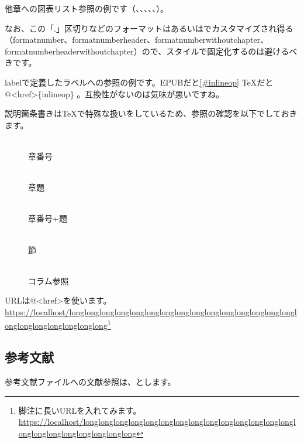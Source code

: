 他章への図表リスト参照の例です（、、、、、）。

なお、この「.」区切りなどのフォーマットはあるいはでカスタマイズされ得る（format\textunderscore{}number、format\textunderscore{}number\textunderscore{}header、format\textunderscore{}number\textunderscore{}without\textunderscore{}chapter、format\textunderscore{}number\textunderscore{}header\textunderscore{}without\textunderscore{}chapter）ので、スタイルで固定化するのは避けるべきです。

labelで定義したラベルへの参照の例です。EPUBだと\ref{#inlineop} TeXだと@\textless{}href\textgreater{}\{inlineop\} 。互換性がないのは気味が悪いですね。

説明箇条書きはTeXで特殊な扱いをしているため、参照の確認を以下でしておきます。

\begin{description}
\item[] \mbox{} \\
章番号
\item[] \mbox{} \\
章題
\item[] \mbox{} \\
章番号+題
\item[] \mbox{} \\
節
\item[] \mbox{} \\
コラム参照
\end{description}

URLは@\textless{}href\textgreater{}を使います。\url{https://localhost/longlonglonglonglonglonglonglonglonglonglonglonglonglonglonglonglonglonglonglonglonglong}\footnote{脚注に長いURLを入れてみます。\url{https://localhost/longlonglonglonglonglonglonglonglonglonglonglonglonglonglonglonglonglonglonglonglonglong}}

\subsection{参考文献}
\label{sec:2-4-4}

参考文献ファイルへの文献参照は、とします。

